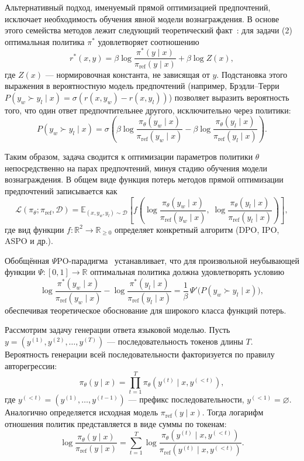 \documentclass[a4paper,12pt]{article}
\begin{document}
Альтернативный подход, именуемый прямой оптимизацией предпочтений, исключает необходимость обучения явной модели вознаграждения. В основе этого семейства методов лежит следующий теоретический факт~\cite{rafailov2023direct}: для задачи (2) оптимальная политика $\pi^*$ удовлетворяет соотношению
\[
r^*(x, y) = \beta \log \frac{\pi^*(y \mid x)}{\pi_{\text{ref}}(y \mid x)} + \beta \log Z(x),
\]
где $Z(x)$ — нормировочная константа, не зависящая от $y$. Подстановка этого выражения в вероятностную модель предпочтений (например, Брэдли–Терри $P(y_w \succ y_l \mid x) = \sigma(r(x, y_w) - r(x, y_l))$) позволяет выразить вероятность того, что один ответ предпочтительнее другого, исключительно через политики:
\[
P(y_w \succ y_l \mid x) = \sigma\left( \beta \log \frac{\pi_\theta(y_w \mid x)}{\pi_{\text{ref}}(y_w \mid x)} - \beta \log \frac{\pi_\theta(y_l \mid x)}{\pi_{\text{ref}}(y_l \mid x)} \right).
\]

Таким образом, задача сводится к оптимизации параметров политики $\theta$ непосредственно на парах предпочтений, минуя стадию обучения модели вознаграждения. В общем виде функция потерь методов прямой оптимизации предпочтений записывается как
\[
\mathcal{L}(\pi_\theta; \pi_{\text{ref}}, \mathcal{D}) = \mathbb{E}_{(x, y_w, y_l) \sim \mathcal{D}} \left[ f\left( \log \frac{\pi_\theta(y_w \mid x)}{\pi_{\text{ref}}(y_w \mid x)}, \; \log \frac{\pi_\theta(y_l \mid x)}{\pi_{\text{ref}}(y_l \mid x)} \right) \right],
\]
где вид функции $f: \mathbb{R}^2 \to \mathbb{R}_{\geq 0}$ определяет конкретный алгоритм (DPO, IPO, ASPO и др.).

Обобщённая $\Psi$PO-парадигма~\cite{azar2024general} устанавливает, что для произвольной неубывающей функции $\Psi: [0,1] \to \mathbb{R}$ оптимальная политика должна удовлетворять условию
\[
\log \frac{\pi^*(y_w \mid x)}{\pi_{\text{ref}}(y_w \mid x)} - \log \frac{\pi^*(y_l \mid x)}{\pi_{\text{ref}}(y_l \mid x)} = \frac{1}{\beta} \, \Psi'\bigl(P(y_w \succ y_l \mid x)\bigr),
\]
обеспечивая теоретическое обоснование для широкого класса функций потерь.

Рассмотрим задачу генерации ответа языковой моделью. Пусть $y = (y^{(1)}, y^{(2)}, \dots, y^{(T)})$ — последовательность токенов длины $T$. Вероятность генерации всей последовательности факторизуется по правилу авторегрессии:
\[
\pi_\theta(y \mid x) = \prod_{t=1}^{T} \pi_\theta(y^{(t)} \mid x, y^{(<t)}),
\]
где $y^{(<t)} = (y^{(1)}, \dots, y^{(t-1)})$ — префикс последовательности, $y^{(<1)} = \varnothing$. Аналогично определяется исходная модель $\pi_{\text{ref}}(y \mid x)$. Тогда логарифм отношения политик представляется в виде суммы по токенам:
\[
\log \frac{\pi_\theta(y \mid x)}{\pi_{\text{ref}}(y \mid x)} = \sum_{t=1}^{T} \log \frac{\pi_\theta(y^{(t)} \mid x, y^{(<t)})}{\pi_{\text{ref}}(y^{(t)} \mid x, y^{(<t)})}.
\]
\end{document}
